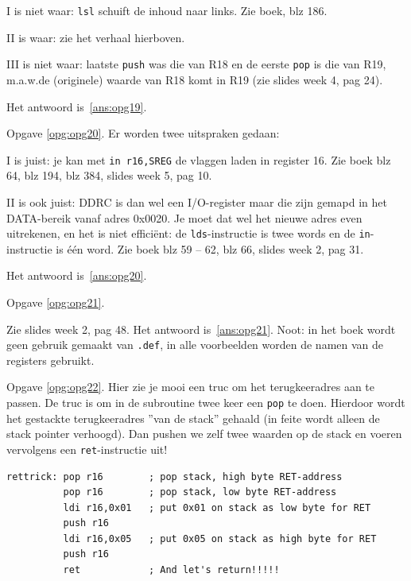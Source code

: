 \documentclass[a4paper,12pt,fleqn,dutch,mimicwordtwentyten]{tisdexam}
\begin{document}
\begin{questions}
I is niet waar: \texttt{lsl} schuift de inhoud naar links. Zie boek, blz 186.

II is waar: zie het verhaal hierboven.

III is niet waar: laatste \texttt{push} was die van R18 en de eerste
\texttt{pop} is die van R19, m.a.w.\@ de (originele) waarde van R18 komt in
R19 (zie slides week 4, pag 24).

Het antwoord is~\ref{ans:opg19}.

\vspace{1em}
Opgave \ref{opg:opg20}.\label{sol:opg20}
Er worden twee uitspraken gedaan:

I is juist: je kan met \texttt{in r16,SREG} de vlaggen laden in register 16.
Zie boek blz 64, blz 194, blz 384, slides week 5, pag 10.

II is ook juist: DDRC is dan wel een I/O-register maar die zijn gemapd in het
DATA-bereik vanaf adres 0x0020. Je moet dat wel het nieuwe adres even
uitrekenen, en het is niet effici\"{e}nt: de \texttt{lds}-instructie is twee
words en de \texttt{in}-instructie is \'{e}\'{e}n word. Zie boek blz 59 -- 62,
blz 66, slides week 2, pag 31. 

Het antwoord is~\ref{ans:opg20}.

\vspace{1em}
Opgave \ref{opg:opg21}.\label{sol:opg21}

Zie slides week 2, pag 48. Het antwoord is~\ref{ans:opg21}. Noot: in het boek
wordt geen gebruik gemaakt van \texttt{.def}, in alle voorbeelden worden de
namen van de registers gebruikt.

\vspace{1em}
Opgave \ref{opg:opg22}.\label{sol:opg22}
Hier zie je mooi een truc om het terugkeeradres aan te passen. De truc is om
in de subroutine twee keer een \texttt{pop} te doen. Hierdoor wordt het
gestackte terugkeeradres ''van de stack'' gehaald (in feite wordt alleen de
stack pointer verhoogd). Dan pushen we zelf twee waarden op de stack en voeren
vervolgens een \texttt{ret}-instructie uit!

\begin{lstlisting}
rettrick: pop r16        ; pop stack, high byte RET-address
          pop r16        ; pop stack, low byte RET-address
          ldi r16,0x01   ; put 0x01 on stack as low byte for RET
          push r16 
          ldi r16,0x05   ; put 0x05 on stack as high byte for RET
          push r16 
          ret            ; And let's return!!!!!
\end{lstlisting}


\end{questions}
\end{document}
